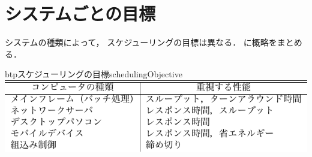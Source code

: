 \section{システムごとの目標}
システムの種類によって，
スケジューリングの目標は異なる．
に概略をまとめる．

\begin{mytable}{btp}{スケジューリングの目標}{schedulingObjective}
  \includegraphics[scale=1.0]{Tbl/schedulingObjective.pdf}
\end{mytable}

